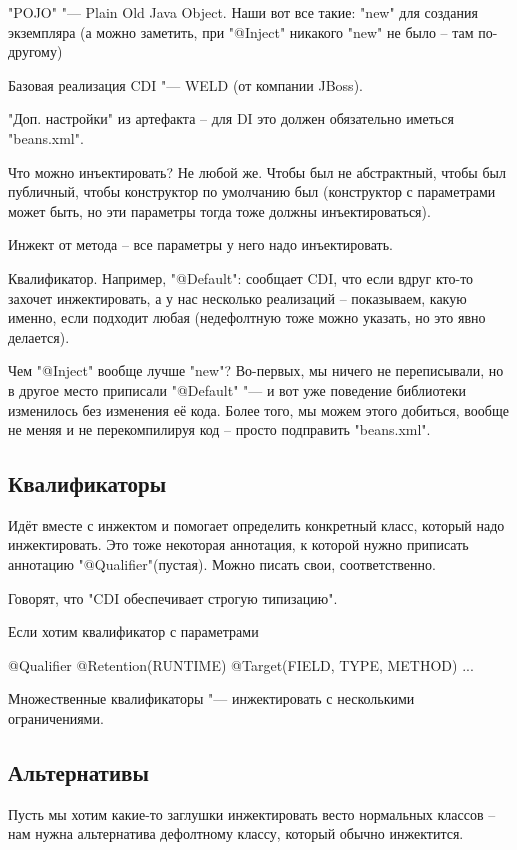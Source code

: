 \java"POJO" "--- Plain Old Java Object. 
Наши вот все такие: \java"new" для создания экземпляра
(а можно заметить, при \java"@Inject" никакого \java"new" не было -- там по-другому)

Базовая реализация CDI "--- WELD (от компании JBoss).

"Доп. настройки" из артефакта -- для DI это должен обязательно иметься \java"beans.xml".

Что можно инъектировать? Не любой же.
Чтобы был не абстрактный, чтобы был публичный, чтобы конструктор по умолчанию был 
(конструктор с параметрами может быть, но эти параметры тогда тоже должны инъектироваться).

Инжект от метода -- все параметры у него надо инъектировать.

Квалификатор. Например, \java"@Default": сообщает CDI, что если вдруг кто-то захочет инжектировать, а у нас несколько реализаций -- 
показываем, какую именно, если подходит любая (недефолтную тоже можно указать, но это явно делается).

Чем \java"@Inject" вообще лучше \java"new"? Во-первых, мы ничего не переписывали, но в другое место приписали \java"@Default" "---
и вот уже поведение библиотеки изменилось без изменения её кода. Более того, мы можем этого добиться, вообще не меняя и не перекомпилируя код -- просто подправить \java"beans.xml".

\subsection{Квалификаторы}
Идёт вместе с инжектом и помогает определить конкретный класс, который надо инжектировать.
Это тоже некоторая аннотация, к которой нужно приписать аннотацию \java"@Qualifier"(пустая).
Можно писать свои, соответственно.

Говорят, что "CDI обеспечивает строгую типизацию".

Если хотим квалификатор с параметрами
\begin{javacode}
@Qualifier
@Retention(RUNTIME)
@Target({FIELD, TYPE, METHOD})
...
\end{javacode}

Множественные квалификаторы "--- инжектировать с несколькими ограничениями.

\subsection{Альтернативы}
Пусть мы хотим какие-то заглушки инжектировать весто нормальных классов -- 
нам нужна альтернатива дефолтному классу, который обычно инжектится.


